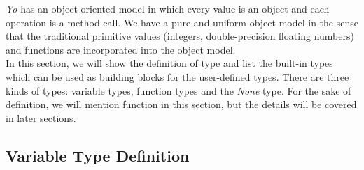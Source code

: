 \documentclass[12pt]{article}
\begin{document}
\textit{Yo} has an object-oriented model in which every value is an object and each operation is a method call. We have a pure and uniform object model in the sense that the traditional primitive values (integers, double-precision floating numbers) and functions are incorporated into the object model.\\

In this section, we will show the definition of type and list the built-in types which can be used as building blocks for the user-defined types. %
There are three kinds of types: variable types, function types and the \textit{None} type. For the sake of definition, we will mention function in this section, but the details will be covered in later sections.\\

\subsection{Variable Type Definition} %
\end{document}
